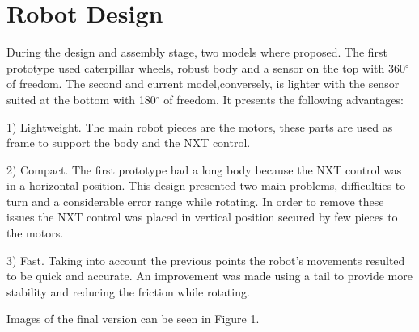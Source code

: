 \documentclass[12pt]{article}
\begin{document}
\section{Robot Design}

During the design and assembly stage, two models where proposed. The first prototype used caterpillar wheels, robust body and a sensor on the top with 360$^{\circ}$ of freedom. The second and current model,conversely, is lighter with the sensor suited at the bottom with 180$^{\circ}$ of freedom. It presents the following advantages: 

1) Lightweight. The main robot pieces are the motors, these parts are used as frame to support the body and the NXT control.

2) Compact. The first prototype had a long body because the NXT control was in a horizontal position. This design presented two main problems, difficulties to turn and a considerable error range while rotating. In order to remove these issues the NXT control was placed in vertical position secured by few pieces to the motors.

3) Fast. Taking into account the previous points the robot's movements resulted to be quick and accurate. An improvement was made using a tail to provide more stability and reducing the friction while rotating. 

Images of the final version can be seen in Figure 1.
\end{document}
